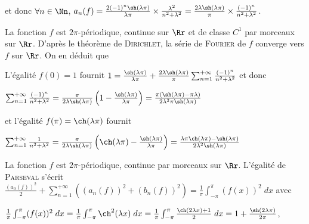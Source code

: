 {{et donc $\forall n\in\Nn$, $a_n(f)=\frac{2(-1)^n\sh(\lambda\pi)}{\lambda\pi}\times\frac{\lambda^2}{n^2+\lambda^2}=\frac{2\lambda\sh(\lambda\pi)}{\pi}\times\frac{(-1)^n}{n^2+\lambda^2}$.

La fonction $f$ est $2\pi$-périodique, continue sur $\Rr$ et de classe $C^1$ par morceaux sur $\Rr$. D'après le théorème de \textsc{Dirichlet}, la série de \textsc{Fourier} de $f$ converge vers $f$ sur $\Rr$. On en déduit que

\begin{center}
\end{center}

L'égalité $f(0)=1$ fournit $1=\frac{\sh(\lambda\pi)}{\lambda\pi}+\frac{2\lambda\sh(\lambda\pi)}{\pi}\sum_{n=1}^{+\infty}\frac{(-1)^n}{n^2+\lambda^2}$ et donc

\begin{center}
$\sum_{n=1}^{+\infty}\frac{(-1)^n}{n^2+\lambda^2}=\frac{\pi}{2\lambda\sh(\lambda\pi)}\left(1-\frac{\sh(\lambda\pi)}{\lambda\pi}\right)=\frac{\pi\left(\sh(\lambda\pi)-\pi\lambda\right)}{2\lambda^2\pi\sh(\lambda\pi)}$
\end{center}

et l'égalité $f(\pi)=\ch(\lambda\pi)$ fournit 

\begin{center}
$\sum_{n=1}^{+\infty}\frac{1}{n^2+\lambda^2}=\frac{\pi}{2\lambda\sh(\lambda\pi)}\left(\ch(\lambda\pi)-\frac{\sh(\lambda\pi)}{\lambda\pi}\right)=\frac{\lambda\pi\ch(\lambda\pi)-\sh(\lambda\pi)}{2\lambda^2\sh(\lambda\pi)}$
\end{center}

\begin{center}
\end{center}

La fonction $f$ est $2\pi$-périodique, continue par morceaux sur $\Rr$. L'égalité de \textsc{Parseval} s'écrit $\frac{(a_0(f))^2}{2}+\sum_{n=1}^{+\infty}((a_n(f))^2+(b_n(f))^2)=\frac{1}{\pi}\int_{-\pi}^{\pi}(f(x))^2\;dx$ avec

\begin{center}
$\frac{1}{\pi}\int_{-\pi}^{\pi}(f(x))^2\;dx=\frac{1}{\pi}\int_{-\pi}^{\pi}\ch^2(\lambda x)\;dx=\frac{1}{\pi}\int_{-\pi}^{\pi}\frac{\ch(2\lambda x)+1}{2}\;dx=1+\frac{\sh(2\lambda\pi)}{2\pi}$,
\end{center}

}}
